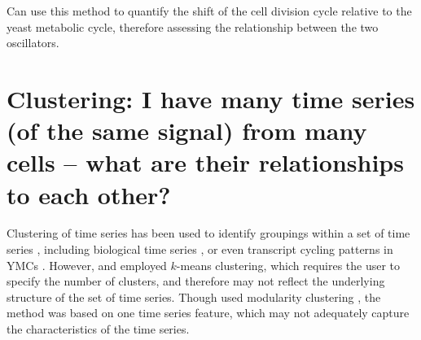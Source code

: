 Can use this method to quantify the shift of the cell division cycle relative to the yeast metabolic cycle, therefore assessing the relationship between the two oscillators.




\section[Clustering]{Clustering: I have many time series (of the same signal) from many cells -- what are their relationships to each other?}
\label{sec:analysis-clustering}


Clustering of time series has been used to identify groupings within a set of time series \parencite{wangStructureBasedStatisticalFeatures2007}, including biological time series \parencite{shafieiDopamineSignalingModulates2019}, or even transcript cycling patterns in YMCs \parencite{tuLogicYeastMetabolic2005}.
However, \textcite{wangStructureBasedStatisticalFeatures2007} and \textcite{tuLogicYeastMetabolic2005} employed $k$-means clustering, which requires the user to specify the number of clusters, and therefore may not reflect the underlying structure of the set of time series.
Though \textcite{shafieiDopamineSignalingModulates2019} used modularity clustering \parencite{newmanModularityCommunityStructure2006}, the method was based on one time series feature, which may not adequately capture the characteristics of the time series.

